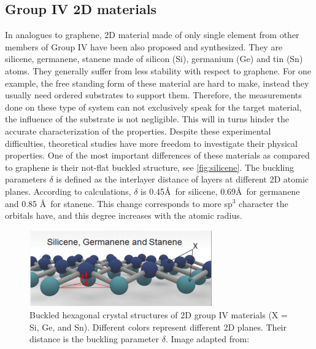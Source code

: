 \subsection{Group IV 2D materials}

In analogues to graphene, 2D material made of only single element from other members of Group IV have been also proposed and synthesized. They are silicene, germanene, stanene made of silicon (Si), germanium (Ge) and tin (Sn) atoms. They generally suffer from less stability with respect to graphene. For one example, the free standing form of these material are hard to make, instead they usually need ordered substrates to support them. Therefore, the measurements done on these type of system can not exclusively speak for the target material, the influence of the substrate is not negligible\cite{Lin2013,}. This will in turns hinder the accurate characterization of the properties. Despite these experimental difficulties, theoretical studies have more freedom to investigate their physical properties. One of the most important differences of these materials as compared to graphene is their not-flat buckled structure, see \autoref{fig:silicene}. The buckling parameters $\delta$ is defined as the interlayer distance of layers at different 2D atomic planes. According to calculations, $\delta$ is 0.45\AA~for silicene, 0.69\AA~for germanene and 0.85 \AA~for stanene\cite{matthes2013}. This change corresponds to more sp$^3$ character the orbitals have, and this degree increases with the atomic radius. 

\begin{figure}[htbp!] 
\centering  
\includegraphics[width=0.7\textwidth]{silicene_structure.png}
\caption{Buckled hexagonal crystal structures of 2D group IV materials (X = Si, Ge, and Sn). Different colors represent different 2D planes. Their distance is the buckling parameter $\delta$. Image adapted from:\cite{Balendhran2015}}  
\label{fig:silicene}
\end{figure} 


